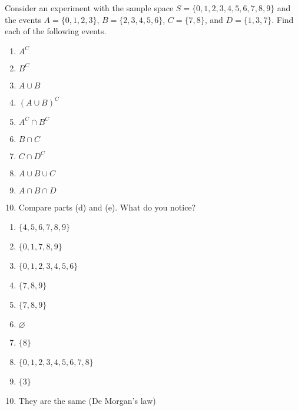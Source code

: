 \documentclass{report}
\begin{document}
    \begin{mdframed}
        Consider an experiment with the sample space \( S = \{0, 1, 2, 3, 4, 5, 6, 7, 8, 9\} \) and the events \( A = \{0, 1, 2, 3\} \), \( B = \{2, 3, 4, 5, 6\} \), \( C = \{7, 8\} \), and \( D = \{1, 3, 7\} \). Find each of the following events. 
        \begin{enumerate}[label=(\alph*)]
            \item $A^{C}$
            \item $B^{C} $
            \item $A\cup B $
            \item $(A\cup B)^{C} $
            \item $A^{C} \cap B^{C} $
            \item  $B \cap C $
            \item $C \cap D^{C} $
            \item  $A\cup B \cup C $
            \item  $A\cap B \cap D $
            \item Compare parts (d) and (e). What do you notice?
        \end{enumerate}
    \end{mdframed}
    \bigbreak \noindent 
    \begin{enumerate}[label=(\alph*)]
        \item $\{4,5,6,7,8,9\} $
        \item $\{0,1,7,8,9\} $
        \item $\{0,1,2,3,4,5,6\} $
        \item $\{7,8,9\} $
        \item $\{7,8,9\} $
        \item $\varnothing$
        \item $\{8\} $
        \item $\{0,1,2,3,4,5,6,7,8\} $
        \item $\{3\} $
        \item They are the same (De Morgan's law)
    \end{enumerate}
\end{document}
